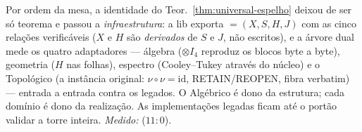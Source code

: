 \documentclass[livro.tex]{subfiles}
\begin{document}
\begin{observacao}\label{obs:nucleo}
Por ordem da mesa, a identidade do Teor.~\ref{thm:universal-espelho}
deixou de ser s\'o teorema e passou a \emph{infraestrutura}: a lib
exporta  $=(X,S,H,J)$ com as cinco rela\c{c}\~oes
verific\'aveis ($X$ e $H$ s\~ao \emph{derivados} de $S$ e $J$, n\~ao
escritos), e a \'arvore dual mede os quatro adaptadores --- \'algebra
($\otimes I_{4}$ reproduz os blocos byte a byte), geometria ($H$ nas
folhas), espectro (Cooley--Tukey atrav\'es do n\'ucleo) e o Topol\'ogico (a
inst\^ancia original: $\nu\circ\nu=\mathrm{id}$, RETAIN/REOPEN, fibra
verbatim) --- entrada a entrada contra os legados. O Algébrico \'e dono
da estrutura; cada dom\'inio \'e dono da realiza\c{c}\~ao. As
implementa\c{c}\~oes legadas ficam at\'e o port\~ao 
validar a torre inteira.
\emph{Medido:}  ($11{:}0$).
\end{observacao}
\end{document}

